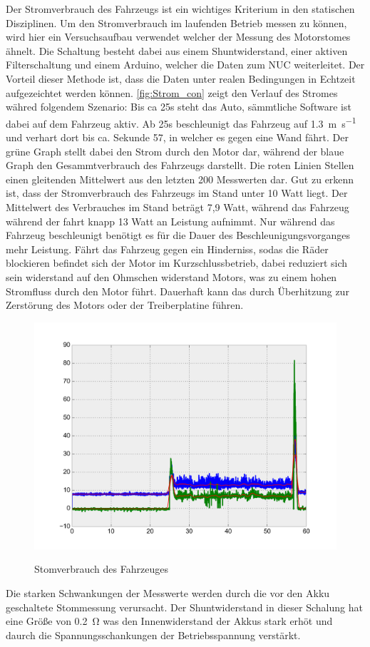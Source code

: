 Der Stromverbrauch des Fahrzeugs ist ein wichtiges Kriterium in den statischen Disziplinen. Um den Stromverbrauch im laufenden Betrieb messen zu können, wird hier ein Versuchsaufbau verwendet welcher der Messung des
Motorstomes ähnelt. Die Schaltung besteht dabei aus einem Shuntwiderstand, einer aktiven Filterschaltung und einem Arduino, welcher die Daten zum NUC weiterleitet. Der Vorteil dieser Methode ist, dass die Daten
unter realen Bedingungen in Echtzeit aufgezeichtet werden können. \cref{fig:Strom_con} zeigt den Verlauf des Stromes währed folgendem Szenario: Bis ca 25s steht das Auto, sämmtliche Software ist dabei auf 
dem Fahrzeug aktiv. Ab 25s beschleunigt das Fahrzeug auf \SI{1,3}{\metre\per\second} und verhart dort bis ca. Sekunde 57, in welcher es gegen eine Wand fährt. Der grüne Graph stellt dabei den Strom durch den Motor dar, während
der blaue Graph den Gesammtverbrauch des Fahrzeugs darstellt. Die roten Linien Stellen einen gleitenden Mittelwert aus den letzten 200 Messwerten dar. Gut zu erkenn ist, dass der Stromverbrauch des Fahrzeugs im Stand unter 
10 Watt liegt. Der Mittelwert des Verbrauches im Stand beträgt 7,9 Watt, während das Fahrzeug während der fahrt knapp 13 Watt an Leistung aufnimmt. Nur während das Fahrzeug beschleunigt benötigt es für die Dauer
des Beschleunigungsvorganges mehr Leistung. Fährt das Fahrzeug gegen ein Hinderniss, sodas die Räder blockieren befindet sich der Motor im Kurzschlussbetrieb, dabei reduziert sich sein widerstand auf den Ohmschen widerstand
Motors, was zu einem hohen Stromfluss durch den Motor führt. Dauerhaft kann das durch Überhitzung zur Zerstörung des Motors oder der Treiberplatine führen.


\begin{figure}[H]
\centering
\includegraphics[width=.8\textwidth]{Strom/Power.png}\\
\caption{Stomverbrauch des Fahrzeuges}%
\label{fig:Power_con}
\end{figure}


Die starken Schwankungen der Messwerte werden durch die vor den Akku geschaltete Stommessung verursacht. Der Shuntwiderstand in dieser Schalung hat eine Größe von
\SI{0,2}{\ohm} was den Innenwiderstand der Akkus stark erhöt und daurch die Spannungsschankungen der Betriebsspannung verstärkt. 

